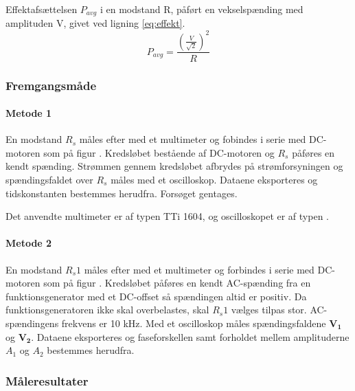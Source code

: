 Effektafsættelsen $P_{avg}$ i en modstand R, påført en vekselspænding med amplituden V, givet ved ligning \ref{eq:effekt}.
\begin{equation}
	P_{avg}=\frac{\left(\frac{V}{\sqrt{2}}\right)^2}{R}
	\label{eq:effekt}
 \end{equation}
\subsubsection{Fremgangsmåde}
\paragraph{Metode 1}
En modstand $R_s$ måles efter med et multimeter og fobindes i serie med DC-motoren
som på figur %
.
Kredsløbet bestående af DC-motoren og $R_s$ påføres en kendt spænding.
Strømmen gennem kredsløbet afbrydes på strømforsyningen og spændingsfaldet
over $R_s$ måles med et oscilloskop.
Dataene eksporteres og tidskonstanten bestemmes herudfra.
Forsøget gentages.

Det anvendte multimeter er af typen TTi 1604,
og oscilloskopet er af typen .

\paragraph{Metode 2}
En modstand $R_s1$ måles efter med et multimeter og forbindes i serie med DC-motoren
som på figur %
.
Kredsløbet påføres en kendt AC-spænding fra en funktionsgenerator med et DC-offset så spændingen
altid er positiv.
Da funktionsgeneratoren ikke skal overbelastes, skal $R_s1$ vælges tilpas stor.
AC-spændingens frekvens er 10 kHz.
Med et oscilloskop måles spændingsfaldene $\mathbf{V_1}$ og $\mathbf{V_2}$.
Dataene eksporteres og faseforskellen samt forholdet mellem amplituderne $A_1$ og $A_2$ bestemmes herudfra.
\subsubsection{Måleresultater}
